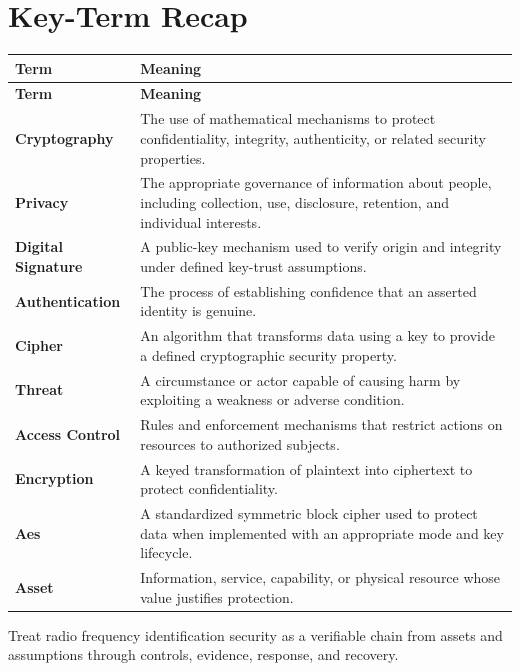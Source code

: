 \documentclass[11pt]{article}
\begin{document}
\section*{Key-Term Recap}
\begin{longtable}{>{\RaggedRight\arraybackslash}p{}>{\RaggedRight\arraybackslash}p{}}
\toprule\rowcolor{Navy}\color{white}\textbf{Term} & \color{white}\textbf{Meaning}\\\midrule
\endfirsthead
\toprule\rowcolor{Navy}\color{white}\textbf{Term} & \color{white}\textbf{Meaning}\\\midrule
\endhead
\textbf{Cryptography} & The use of mathematical mechanisms to protect confidentiality, integrity, authenticity, or related security properties. \\\midrule
\textbf{Privacy} & The appropriate governance of information about people, including collection, use, disclosure, retention, and individual interests. \\\midrule
\textbf{Digital Signature} & A public-key mechanism used to verify origin and integrity under defined key-trust assumptions. \\\midrule
\textbf{Authentication} & The process of establishing confidence that an asserted identity is genuine. \\\midrule
\textbf{Cipher} & An algorithm that transforms data using a key to provide a defined cryptographic security property. \\\midrule
\textbf{Threat} & A circumstance or actor capable of causing harm by exploiting a weakness or adverse condition. \\\midrule
\textbf{Access Control} & Rules and enforcement mechanisms that restrict actions on resources to authorized subjects. \\\midrule
\textbf{Encryption} & A keyed transformation of plaintext into ciphertext to protect confidentiality. \\\midrule
\textbf{Aes} & A standardized symmetric block cipher used to protect data when implemented with an appropriate mode and key lifecycle. \\\midrule
\textbf{Asset} & Information, service, capability, or physical resource whose value justifies protection. \\\midrule
\bottomrule
\end{longtable}
\begin{takeawaybox}
Treat radio frequency identification security as a verifiable chain from assets and assumptions through controls, evidence, response, and recovery.
\end{takeawaybox}
\end{document}
